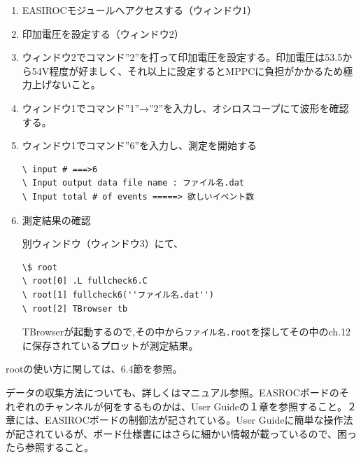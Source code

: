 \begin{enumerate}
  \item EASIROCモジュールへアクセスする（ウィンドウ1）
  \item 印加電圧を設定する（ウィンドウ2）
  \item ウィンドウ2でコマンド''2''を打って印加電圧を設定する。印加電圧は53.5から54V程度が好ましく、それ以上に設定するとMPPCに負担がかかるため極力上げないこと。
  \item ウィンドウ1でコマンド''1''→''2''を入力し、オシロスコープにて波形を確認する。
  \item ウィンドウ1でコマンド''6''を入力し、測定を開始する\par
        \begin{lstlisting}[caption=測定手順]
\ input # ===>6
\ Input output data file name : ファイル名.dat
\ Input total # of events =====> 欲しいイベント数
\end{lstlisting}
  \item 測定結果の確認\par
        別ウィンドウ（ウィンドウ3）にて、
        \begin{lstlisting}[caption=測定結果の確認]
\$ root
\ root[0] .L fullcheck6.C
\ root[1] fullcheck6(''ファイル名.dat'')
\ root[2] TBrowser tb
\end{lstlisting}
        TBrowserが起動するので,その中から{\tt ファイル名.root}を探してその中のch.12に保存されているプロットが測定結果。
\end{enumerate}
rootの使い方に関しては、6.4節を参照。\par
データの収集方法についても、詳しくはマニュアル参照。EASROCボードのそれぞれのチャンネルが何をするものかは、User Guideの１章を参照すること。２章には、EASIROCボードの制御法が記されている。User Guideに簡単な操作法が記されているが、ボード仕様書にはさらに細かい情報が載っているので、困ったら参照すること。
